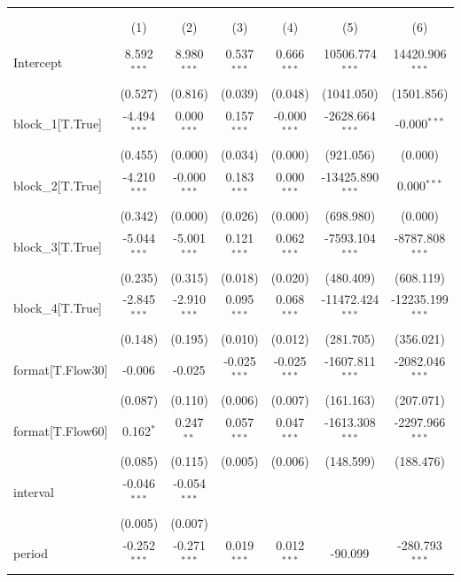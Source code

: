 \begin{table}[!htbp] \centering
\begin{tabular}{@{\extracolsep{5pt}}lcccccc}
\\[-1.8ex]\hline
\hline \\[-1.8ex]
\\[-1.8ex] & (1) & (2) & (3) & (4) & (5) & (6) \\
\hline \\[-1.8ex]
 Intercept & 8.592$^{***}$ & 8.980$^{***}$ & 0.537$^{***}$ & 0.666$^{***}$ & 10506.774$^{***}$ & 14420.906$^{***}$ \\
& (0.527) & (0.816) & (0.039) & (0.048) & (1041.050) & (1501.856) \\
 block_1[T.True] & -4.494$^{***}$ & 0.000$^{***}$ & 0.157$^{***}$ & -0.000$^{***}$ & -2628.664$^{***}$ & -0.000$^{***}$ \\
& (0.455) & (0.000) & (0.034) & (0.000) & (921.056) & (0.000) \\
 block_2[T.True] & -4.210$^{***}$ & -0.000$^{***}$ & 0.183$^{***}$ & 0.000$^{***}$ & -13425.890$^{***}$ & 0.000$^{***}$ \\
& (0.342) & (0.000) & (0.026) & (0.000) & (698.980) & (0.000) \\
 block_3[T.True] & -5.044$^{***}$ & -5.001$^{***}$ & 0.121$^{***}$ & 0.062$^{***}$ & -7593.104$^{***}$ & -8787.808$^{***}$ \\
& (0.235) & (0.315) & (0.018) & (0.020) & (480.409) & (608.119) \\
 block_4[T.True] & -2.845$^{***}$ & -2.910$^{***}$ & 0.095$^{***}$ & 0.068$^{***}$ & -11472.424$^{***}$ & -12235.199$^{***}$ \\
& (0.148) & (0.195) & (0.010) & (0.012) & (281.705) & (356.021) \\
 format[T.Flow30] & -0.006$^{}$ & -0.025$^{}$ & -0.025$^{***}$ & -0.025$^{***}$ & -1607.811$^{***}$ & -2082.046$^{***}$ \\
& (0.087) & (0.110) & (0.006) & (0.007) & (161.163) & (207.071) \\
 format[T.Flow60] & 0.162$^{*}$ & 0.247$^{**}$ & 0.057$^{***}$ & 0.047$^{***}$ & -1613.308$^{***}$ & -2297.966$^{***}$ \\
& (0.085) & (0.115) & (0.005) & (0.006) & (148.599) & (188.476) \\
 interval & -0.046$^{***}$ & -0.054$^{***}$ & & & & \\
& (0.005) & (0.007) & & & & \\
 period & -0.252$^{***}$ & -0.271$^{***}$ & 0.019$^{***}$ & 0.012$^{***}$ & -90.099$^{}$ & -280.793$^{***}$ \\

\end{tabular}
\end{table}
